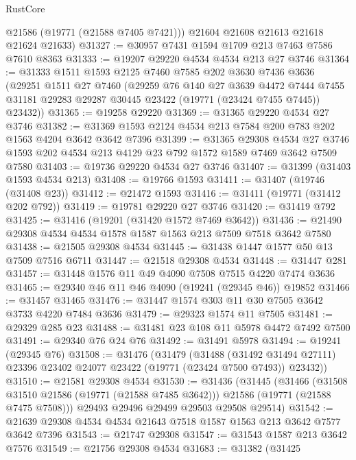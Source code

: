 \begin{lexlean}{RustCore}
\begin{coremodule}
        @21586
        (@19771 (@21588 @7405 @7421)))
      @21604
      @21608
      @21613
      @21618
      @21624
      @21633)
@31327 := @30957 @7431 @1594 @1709 @213 @7463 @7586 @7610 @8363
@31333 := @19207 @29220 @4534 @4534 @213 @27 @3746
@31364 := @31333
    @1511
    @1593
    @2125
    @7460
    @7585
    @202
    @3630
    @7436
    @3636
    (@29251
      @1511
      @27
      @7460
      (@29259
        @76
        @140
        @27
        @3639
        @4472
        @7444
        @7455
        @31181
        @29283
        @29287
        @30445
        @23422
        (@19771 (@23424 @7455 @7445))
        @23432))
@31365 := @19258 @29220
@31369 := @31365 @29220 @4534 @27 @3746
@31382 := @31369 @1593 @2124 @4534 @213 @7584 @200 @783 @202 @1563 @4204 @3642 @3642 @7396
@31399 := @31365
    @29308
    @4534
    @27
    @3746
    @1593
    @202
    @4534
    @213
    @4129
    @23
    @792
    @1572
    @1589
    @7469
    @3642
    @7509
    @7580
@31403 := @19736 @29220 @4534 @27 @3746
@31407 := @31399 (@31403 @1593 @4534 @213)
@31408 := @19766 @1593
@31411 := @31407 (@19746 (@31408 @23))
@31412 := @21472 @1593
@31416 := @31411 (@19771 (@31412 @202 @792))
@31419 := @19781 @29220 @27 @3746
@31420 := @31419 @792
@31425 := @31416 (@19201 (@31420 @1572 @7469 @3642))
@31436 := @21490 @29308 @4534 @4534 @1578 @1587 @1563 @213 @7509 @7518 @3642 @7580
@31438 := @21505 @29308 @4534
@31445 := @31438 @1447 @1577 @50 @13 @7509 @7516 @6711
@31447 := @21518 @29308 @4534
@31448 := @31447 @281
@31457 := @31448 @1576 @11 @49 @4090 @7508 @7515 @4220 @7474 @3636
@31465 := @29340 @46 @11 @46 @4090 (@19241 (@29345 @46)) @19852
@31466 := @31457 @31465
@31476 := @31447 @1574 @303 @11 @30 @7505 @3642 @3733 @4220 @7484 @3636
@31479 := @29323 @1574 @11 @7505
@31481 := @29329 @285 @23
@31488 := @31481 @23 @108 @11 @5978 @4472 @7492 @7500
@31491 := @29340 @76 @24 @76
@31492 := @31491 @5978
@31494 := @19241 (@29345 @76)
@31508 := @31476
    (@31479
      (@31488
        (@31492 @31494 @27111)
        @23396
        @23402
        @24077
        @23422
        (@19771 (@23424 @7500 @7493))
        @23432))
@31510 := @21581 @29308 @4534
@31530 := @31436
    (@31445
      (@31466
        (@31508 @31510 @21586 (@19771 (@21588 @7485 @3642)))
        @21586
        (@19771 (@21588 @7475 @7508)))
      @29493
      @29496
      @29499
      @29503
      @29508
      @29514)
@31542 := @21639 @29308 @4534 @4534 @21643 @7518 @1587 @1563 @213 @3642 @7577 @3642 @7396
@31543 := @21747 @29308
@31547 := @31543 @1587 @213 @3642 @7576
@31549 := @21756 @29308 @4534
@31683 := @31382
    (@31425

\end{coremodule}
\end{lexlean}
